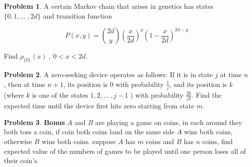\documentclass[12pt]{extreport}
\theoremstyle{definition}
\newtheorem{prob}{Problem}
\begin{document}
    \begin{prob}
        A certain Markov chain that arises in genetics has states \(\{0, 1, \dots\ , 2d\}\) and transition function

        \[P(x,y) = \binom{2d}{y}\left(\frac{x}{2d}\right)^y\left(1 - \frac{x}{2d}\right)^{2d-y}\]

        Find \(\rho_{\{0\}}(x) \ , \ 0 < x < 2d\).
    \end{prob}
    
    \begin{prob}
        A zero-seeking device operates as follows: If it is in state \(j\) at time \(n\), then at time \(n + 1\), its position is 0 with probability \(\frac{1}{j}\), and its position is \(k\) (where \(k\) is one of the states \(1, 2, \dots\ , j - 1 \) ) with probability \(\frac{2k}{j2}\). Find the expected time until the device first hits zero starting from state \(m\).
    \end{prob}

    \begin{prob}
        \textbf{Bonus} $A$ and $B$ are playing a game on coins, in each around they both toss a coin, if coin both coins land on the same side $A$ wins both coins, otherwise $B$ wins both coins. suppose $A$ has $m$ coins and $B$ has $n$ coins, find expected value of the numbers of games to be played until one person loses all of their coin's. 
    \end{prob}
\end{document}
